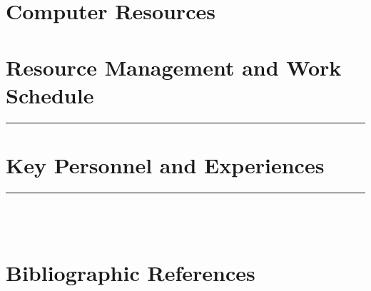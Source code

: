\documentclass [a4paper, 11pt]{article}
\begin{document}



\section{Computer Resources}






\section{Resource Management and Work Schedule}
\rule{\textwidth}{0.4pt}



\section{Key Personnel and Experiences}
\rule{\textwidth}{0.4pt}\\
\\

\section{Bibliographic References}

\footnotesize{
	
}
\end{document}

